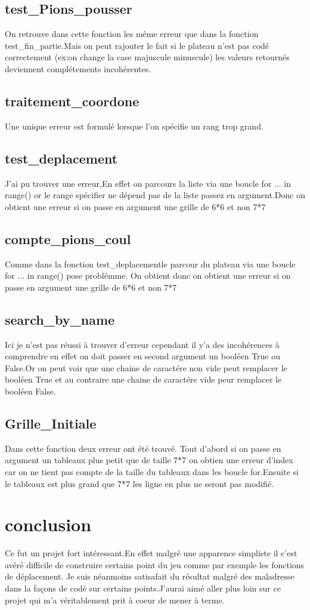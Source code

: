 \documentclass{article}
\begin{document}
\subsection{test\_Pions\_pousser}
On retrouve dans cette fonction les même erreur que dans la fonction test\_fin\_partie.Mais on peut rajouter le fait si le plateau n'est pas codé correctement (ex:on change la case majuscule minuscule) les valeurs retournés deviennent complétements incohérentes.

\subsection{traitement\_coordone}
Une unique erreur est formulé lorsque l'on spécifie un rang trop grand.

\subsection{test\_deplacement}
J'ai pu trouver une erreur,En effet on parcours la liste via une boucle for ... in range() or le range spécifier ne dépend pas de la liste passez en argument.Donc on obtient une erreur si on passe en argument une grille de 6*6 et non 7*7
\subsection{compte\_pions\_coul}
Comme dans la fonction test\_deplacementle parcour du plateau via une boucle for ... in range() pose problémme. On obtient donc on obtient une erreur si on passe en argument une grille de 6*6 et non 7*7
\subsection{search\_by\_name}
Ici je n'est pas réussi à trouver d'erreur cependant il y'a des incohérences à comprendre en effet on doit passer en second argument un booléen True ou False.Or on peut voir que une chaine de caractére non vide peut remplacer le booléen True et au contraire une chaine de caractére vide peur remplacer le booléen False.

\subsection{Grille\_Initiale}
Dans cette fonction deux erreur ont été trouvé. Tout d'abord si on passe en argument un tableaux plus petit que de taille 7*7 on obtien une erreur d'index car on ne tient pas compte de la taille du tableaux dans les boucle for.Ensuite si le tableaux est plus grand que 7*7 les ligne en plus ne seront pas modifié.

\section{conclusion}
Ce fut un projet fort intéressant.En effet malgré une apparence simpliste il c'est avéré difficile de construire certains point du jeu comme par exemple les fonctions de déplacement. Je suis néanmoins satisafait du résultat malgré des maladresse dans la façons de codé sur certains points.J'aurai aimé aller plus loin sur ce projet qui m'a véritablement prit à coeur de mener à terme.
\end{document}
